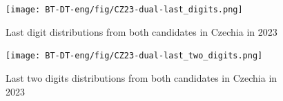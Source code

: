 \begin{figure}[h]
    \centering
    \caption{Last digit distributions from both candidates in Czechia in 2023}
    \texttt{[image: BT-DT-eng/fig/CZ23-dual-last\_digits.png]}
    \label{fig:CZ23-dual-last_digits}
\end{figure}


\begin{figure}[h]
    \centering
    \caption{Last two digits distributions from both candidates in Czechia in 2023}
    \texttt{[image: BT-DT-eng/fig/CZ23-dual-last\_two\_digits.png]}
    \label{fig:CZ23-dual-last_two_digits}
\end{figure}















